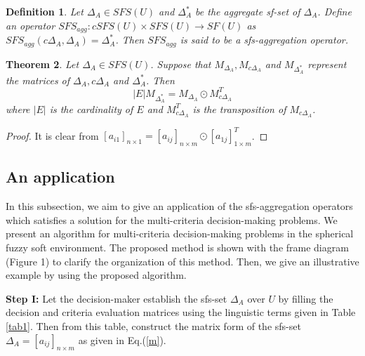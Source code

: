 \documentclass{IJFS}
\newtheorem{theorem}{Theorem}[section]
\newtheorem{definition}[theorem]{Definition}
\begin{document}
\begin{definition} Let $\Delta_A\in SFS(U)$ and $\Delta_A^*$ be
the aggregate sf-set of $\Delta_A$. Define an operator \linebreak[4]
$SFS_{agg}:cSFS(U)\times SFS(U)\to SF(U)$ as $SFS_{agg}(c\Delta_A,
\Delta_A)=\Delta_A^*$. Then $SFS_{agg}$ is said to be a
sfs-aggregation operator.

\end{definition}




\begin{theorem} Let $\Delta_A\in SFS(U)$. Suppose that $M_{\Delta_A},
M_{c\Delta_A}$ and $M_{\Delta_A^*}$ represent the matrices of
${\Delta_A}, {c\Delta_A}$ and ${\Delta_A^*}$. Then
\begin{equation} \label{h}
 |E|M_{\Delta_A^*}=M_{\Delta_A} \odot M_{c\Delta_A}^T
\end{equation}
where $|E|$ is the cardinality of $E$ and $M_{c\Delta_A}^T$ is the
transposition of $M_{c\Delta_A}$.
\end{theorem}
\begin{proof} It is clear from $[a_{i1}]_{n\times
1}=[a_{ij}]_{n\times m}\odot[a_{1j}]_{1\times m}^T$.
\end{proof}


\subsection{An application}
In this subsection, we aim to give an application of the sfs-aggregation operators which satisfies a solution for the multi-criteria decision-making problems. We present an algorithm for multi-criteria decision-making problems in the spherical fuzzy soft environment. The proposed method is shown with the frame diagram (Figure 1) to clarify the organization of this method. Then, we give an illustrative example by using the proposed algorithm.


\textbf{Step I:} Let the decision-maker establish the sfs-set
$\Delta_A$ over $U$ by filling the decision and criteria
evaluation matrices using the linguistic terms given in Table
\ref{tab1}. Then from this table, construct the matrix form of the
sfs-set $\Delta_A=[a_{ij}]_{n\times m}$ as given in Eq.(\ref{m}).
\end{document}
